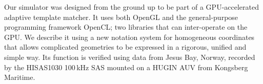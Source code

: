 

Our simulator was designed from the ground up to be part of a GPU-accelerated adaptive template matcher. It uses both OpenGL and the general-purpose programming framework OpenCL; two libraries that can inter-operate on the GPU. We describe it using a new notation system for homogeneous coordinates that allows complicated geometries to be expressed in a rigorous, unified and simple way. Its function is verified using data from Jesus Bay, Norway, recorded by the HISAS1030 100\,kHz SAS  mounted on a HUGIN AUV from Kongsberg Maritime.

%
%









